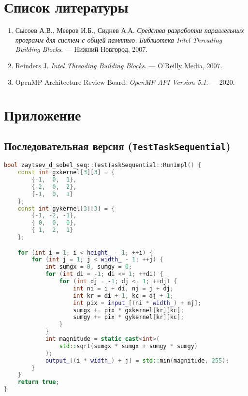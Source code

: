 \documentclass[12pt]{article}
\begin{document}
\section{Список литературы}
\begin{enumerate}
 \item Сысоев А.В., Мееров И.Б., Сиднев А.А. \textit{Средства разработки параллельных программ для систем с общей памятью. Библиотека Intel Threading Building Blocks}. — Нижний Новгород, 2007.
    \item Reinders J. \textit{Intel Threading Building Blocks}. — O’Reilly Media, 2007.
    \item OpenMP Architecture Review Board. \textit{OpenMP API Version 5.1}. — 2020.

\end{enumerate}

\newpage
\appendix
\section{Приложение}

\subsection{Последовательная версия (\texttt{TestTaskSequential})}

\begin{lstlisting}[language=C++, caption={Последовательная реализация оператора Собеля}]
bool zaytsev_d_sobel_seq::TestTaskSequential::RunImpl() {
    const int gxkernel[3][3] = {
        {-1,  0,  1},
        {-2,  0,  2},
        {-1,  0,  1}
    };
    const int gykernel[3][3] = {
        {-1, -2, -1},
        { 0,  0,  0},
        { 1,  2,  1}
    };

    for (int i = 1; i < height_ - 1; ++i) {
        for (int j = 1; j < width_ - 1; ++j) {
            int sumgx = 0, sumgy = 0;
            for (int di = -1; di <= 1; ++di) {
                for (int dj = -1; dj <= 1; ++dj) {
                    int ni = i + di, nj = j + dj;
                    int kr = di + 1, kc = dj + 1;
                    int pix = input_[(ni * width_) + nj];
                    sumgx += pix * gxkernel[kr][kc];
                    sumgy += pix * gykernel[kr][kc];
                }
            }
            int magnitude = static_cast<int>(
                std::sqrt(sumgx * sumgx + sumgy * sumgy)
            );
            output_[(i * width_) + j] = std::min(magnitude, 255);
        }
    }
    return true;
}
\end{lstlisting}
\end{document}
